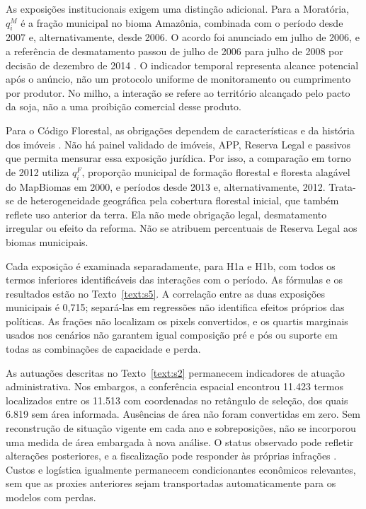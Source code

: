 As exposições institucionais exigem uma distinção adicional. Para a Moratória, $q_i^M$ é a fração municipal no bioma Amazônia, combinada com o período desde 2007 e, alternativamente, desde 2006. O acordo foi anunciado em julho de 2006, e a referência de desmatamento passou de julho de 2006 para julho de 2008 por decisão de dezembro de 2014 \cite{GTS2015Moratoria}. O indicador temporal representa alcance potencial após o anúncio, não um protocolo uniforme de monitoramento ou cumprimento por produtor. No milho, a interação se refere ao território alcançado pelo pacto da soja, não a uma proibição comercial desse produto.

Para o Código Florestal, as obrigações dependem de características e da história dos imóveis \cite{Brasil2012,SticklerEtAl2013}. Não há painel validado de imóveis, APP, Reserva Legal e passivos que permita mensurar essa exposição jurídica. Por isso, a comparação em torno de 2012 utiliza $q_i^F$, proporção municipal de formação florestal e floresta alagável do MapBiomas em 2000, e períodos desde 2013 e, alternativamente, 2012. Trata-se de heterogeneidade geográfica pela cobertura florestal inicial, que também reflete uso anterior da terra. Ela não mede obrigação legal, desmatamento irregular ou efeito da reforma. Não se atribuem percentuais de Reserva Legal aos biomas municipais.

Cada exposição é examinada separadamente, para H1a e H1b, com todos os termos inferiores identificáveis das interações com o período. As fórmulas e os resultados estão no Texto~\ref{text:s5}. A correlação entre as duas exposições municipais é 0,715; separá-las em regressões não identifica efeitos próprios das políticas. As frações não localizam os pixels convertidos, e os quartis marginais usados nos cenários não garantem igual composição pré e pós ou suporte em todas as combinações de capacidade e perda.

As autuações descritas no Texto~\ref{text:s2} permanecem indicadores de atuação administrativa. Nos embargos, a conferência espacial encontrou 11.423 termos localizados entre os 11.513 com coordenadas no retângulo de seleção, dos quais 6.819 sem área informada. Ausências de área não foram convertidas em zero. Sem reconstrução de situação vigente em cada ano e sobreposições, não se incorporou uma medida de área embargada à nova análise. O status observado pode refletir alterações posteriores, e a fiscalização pode responder às próprias infrações \cite{Sousa2016,AssuncaoEtAl2023}. Custos e logística igualmente permanecem condicionantes econômicos relevantes, sem que as proxies anteriores sejam transportadas automaticamente para os modelos com perdas.

